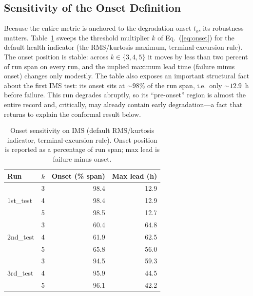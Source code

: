 \documentclass[IJPHM, 2026, 0]{PHMSociety}
\begin{document}
\subsection{Sensitivity of the Onset Definition}
Because the entire metric is anchored to the degradation onset $t_o$, its robustness matters. Table~\ref{tab:onsetsens} sweeps the threshold multiplier $k$ of Eq.~(\ref{eq:onset}) for the default health indicator (the RMS/kurtosis maximum, terminal-excursion rule). The onset position is stable: across $k \in \{3,4,5\}$ it moves by less than two percent of run span on every run, and the implied maximum lead time (failure minus onset) changes only modestly. The table also exposes an important structural fact about the first IMS test: its onset sits at ${\sim}98\%$ of the run span, i.e.\ only ${\sim}12.9$~h before failure. This run degrades abruptly, so its ``pre-onset'' region is almost the entire record and, critically, may already contain early degradation---a fact that returns to explain the conformal result below.

\begin{table}[t] \small
	\begin{center}
	\caption{Onset sensitivity on IMS (default RMS/kurtosis indicator, terminal-excursion rule). Onset position is reported as a percentage of run span; max lead is failure minus onset.}
	\label{tab:onsetsens}
	\begin{tabular}{l c r r}
		\hline \hline
		\textbf{Run} & \textbf{$k$} & \textbf{Onset (\% span)} & \textbf{Max lead (h)} \\
		\hline
		\multirow{3}{*}{1st\_test} & 3 & 98.4 & 12.9 \\
		 & 4 & 98.4 & 12.9 \\
		 & 5 & 98.5 & 12.7 \\
		\hline
		\multirow{3}{*}{2nd\_test} & 3 & 60.4 & 64.8 \\
		 & 4 & 61.9 & 62.5 \\
		 & 5 & 65.8 & 56.0 \\
		\hline
		\multirow{3}{*}{3rd\_test} & 3 & 94.5 & 59.3 \\
		 & 4 & 95.9 & 44.5 \\
		 & 5 & 96.1 & 42.2 \\
		\hline \hline
	\end{tabular}
	\end{center}
\end{table}
\end{document}
